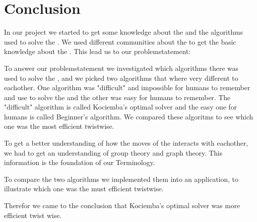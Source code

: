 \chapter{Conclusion}
In our project we started to get some knowledge about the \rubik{} and the algorithms used to solve the \rubik{}. We used different communities about the \rubik{} to get the basic knowledge about the \rubik{}. This lead us to our problemstatement:
%

To answer our problemstatement we investigated which algorithms there was used to solve the \rubik{}, and we picked two algorithms that where very different to eachother. One algorithm was "difficult" and impossible for humans to remember and use to solve the \rubik{} and the other was easy for humans to remember. The "difficult" algorithm is called Kociemba's optimal solver and the easy one for humans is called Beginner's algorithm. We compared these algoritms to see which one was the most efficient twistwise.

To get a better understanding of how the moves of the \rubik{} interacts with eachother, we had to get an understanding of group theory and graph theory. This information is the foundation of our Terminology.

To compare the two algorithms we implemented them into an application, to illustrate which one was the must efficient twistwise. 

Therefor we came to the conclusion that Kociemba's optimal solver was more efficient twist wise.